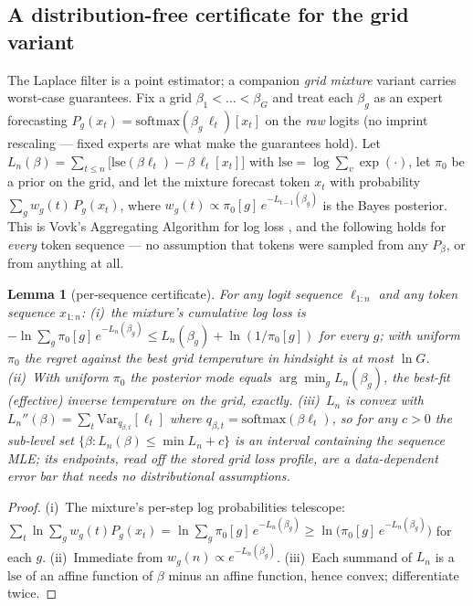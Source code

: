 \documentclass[11pt]{article}
\newtheorem{lemma}{Lemma}
\begin{document}
\subsection{A distribution-free certificate for the grid variant}
\label{sec:certificate}
The Laplace filter is a point estimator; a companion \emph{grid mixture}
variant carries worst-case guarantees. Fix a grid $\beta_1 < \dots < \beta_G$
and treat each $\beta_g$ as an expert forecasting
$P_g(x_t) = \mathrm{softmax}(\beta_g\,\ell_t)[x_t]$ on the \emph{raw} logits
(no imprint rescaling --- fixed experts are what make the guarantees hold).
Let $L_n(\beta) = \sum_{t\le n} \big[\mathrm{lse}(\beta\ell_t) -
\beta\,\ell_t[x_t]\big]$ with $\mathrm{lse} = \log\sum_v \exp(\cdot)$, let
$\pi_0$ be a prior on the grid, and let the mixture forecast token $x_t$ with
probability $\sum_g w_g(t)\,P_g(x_t)$, where $w_g(t) \propto
\pi_0[g]\,e^{-L_{t-1}(\beta_g)}$ is the Bayes posterior. This is Vovk's
Aggregating Algorithm for log loss \citep{vovk1998game,
cesabianchi2006prediction}, and the following holds for \emph{every} token
sequence --- no assumption that tokens were sampled from any $P_\beta$, or
from anything at all.

\begin{lemma}[per-sequence certificate]\label{lem:certificate}
For any logit sequence $\ell_{1:n}$ and any token sequence $x_{1:n}$:
(i)~the mixture's cumulative log loss is
$-\ln \sum_g \pi_0[g]\, e^{-L_n(\beta_g)} \le L_n(\beta_g) +
\ln(1/\pi_0[g])$ for every $g$; with uniform $\pi_0$ the regret against the
best grid temperature in hindsight is at most $\ln G$.
(ii)~With uniform $\pi_0$ the posterior mode equals
$\arg\min_g L_n(\beta_g)$, the best-fit (\emph{effective}) inverse
temperature on the grid, exactly.
(iii)~$L_n$ is convex with $L_n''(\beta) = \sum_t
\mathrm{Var}_{q_{\beta,t}}[\ell_t]$ where $q_{\beta,t} =
\mathrm{softmax}(\beta\ell_t)$, so for any $c > 0$ the sub-level set
$\{\beta : L_n(\beta) \le \min L_n + c\}$ is an interval containing the
sequence MLE; its endpoints, read off the stored grid loss profile, are a
data-dependent error bar that needs no distributional assumptions.
\end{lemma}

\begin{proof}
(i)~The mixture's per-step log probabilities telescope:
$\sum_t \ln \sum_g w_g(t) P_g(x_t) = \ln \sum_g \pi_0[g]\,
e^{-L_n(\beta_g)} \ge \ln\big(\pi_0[g]\, e^{-L_n(\beta_g)}\big)$ for each
$g$. (ii)~Immediate from $w_g(n) \propto e^{-L_n(\beta_g)}$.
(iii)~Each summand of $L_n$ is a $\mathrm{lse}$ of an affine function of
$\beta$ minus an affine function, hence convex; differentiate twice.
\end{proof}
\end{document}
